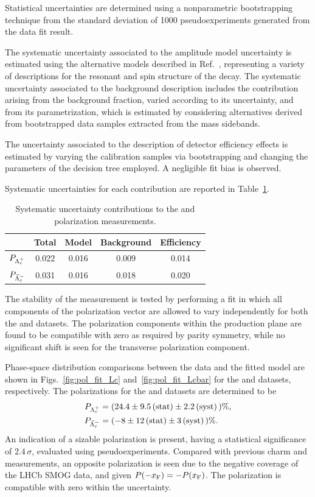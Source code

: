 Statistical uncertainties are determined using a nonparametric bootstrapping technique from the standard deviation of 1000 pseudoexperiments generated from the data fit result.

The systematic uncertainty associated to the \Lcpkpi amplitude model uncertainty is estimated using the alternative models described in Ref.~\cite{LHCb-PAPER-2022-002}, representing a variety of descriptions for the resonant and spin structure of the decay.
The systematic uncertainty associated to the background description includes the contribution arising from the background fraction, varied according to its uncertainty, and from its parametrization, which is estimated by considering alternatives derived from bootstrapped data samples extracted from the mass sidebands.

The uncertainty associated to the description of detector efficiency effects is estimated by varying the calibration samples via bootstrapping and changing the parameters of the decision tree employed. A negligible fit bias is observed.

Systematic uncertainties for each contribution are reported in Table~\ref{tab:syst_pol}.

\begin{table}
\centering
\caption{Systematic uncertainty contributions to the \Lc and \Lcbar polarization measurements.\label{tab:syst_pol}}
\begin{tabular}{lcccc}
\toprule
& Total & Model & Background & Efficiency\\
\midrule
$P_{{\Lambda}^+_{c}}$ & 0.022 & 0.016 & 0.009 & 0.014 \\
$P_{{\kern 0.18em\overline{\kern -0.18em \Lambda}}{}^-_{c}}$ & 0.031 & 0.016 & 0.018 & 0.020 \\
\bottomrule
\end{tabular}
\end{table}

The stability of the measurement is tested by performing a fit in which all components of the polarization vector are allowed to vary independently for both the \Lc and \Lcbar datasets. The polarization components within the production plane are found to be compatible with zero as required by parity symmetry, while no significant shift is seen for the transverse polarization component.


Phase-space distribution comparisons between the data and the fitted model are shown in Figs.~\ref{fig:pol_fit_Lc} and~\ref{fig:pol_fit_Lcbar} for the \Lc and \Lcbar datasets, respectively.
The polarizations for the \Lc and \Lcbar datasets are determined to be
\begin{align*}
P_{{\Lambda}^+_{c}} &= ( 24.4 \pm 9.5 \, (\rm{stat}) \pm 2.2 \, (\rm{syst}) \, )\% ,\\
P_{{\kern 0.18em\overline{\kern -0.18em \Lambda}}{}^-_{c}} &= (-8 \pm 12 \, (\rm{stat}) \pm 3 \,(\rm{syst}) \, ) \%.
\end{align*}
An indication of a sizable \Lc polarization is present, having a statistical significance of $2.4\,\sigma$, evaluated using pseudoexperiments. Compared with previous charm and \Lz measurements, an opposite polarization is seen due to the negative \xf coverage of the LHCb SMOG data, and given $P(-x_{\rm F}) = -P(x_{\rm F})$.
The \Lcbar polarization is compatible with zero within the uncertainty.

